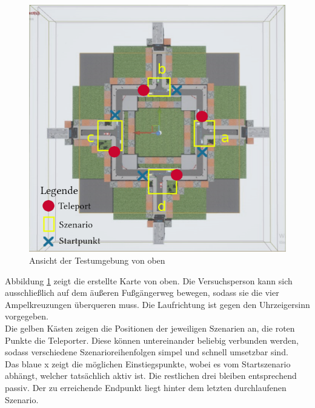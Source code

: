 \documentclass{Bericht}
\begin{document}
 
\begin{figure}[H]
	\centering
	\includegraphics[scale=0.7]{../Bilder/mapLegende.png}
	\caption{Ansicht der Testumgebung von oben}
	\label{img:map}
\end{figure}


Abbildung \ref{img:map} zeigt die erstellte Karte von oben. 
Die Versuchsperson kann sich ausschließlich auf dem äußeren Fußgängerweg bewegen, sodass sie die vier Ampelkreuzungen überqueren muss. Die Laufrichtung ist gegen den Uhrzeigersinn vorgegeben.\\
Die gelben Kästen zeigen die Positionen der jeweiligen Szenarien an, die roten Punkte die Teleporter. Diese können untereinander beliebig verbunden werden, sodass verschiedene Szenarioreihenfolgen simpel und schnell umsetzbar sind.\\
Das blaue x zeigt die möglichen Einstiegspunkte, wobei es vom Startszenario abhängt, welcher tatsächlich aktiv ist. Die restlichen drei bleiben entsprechend passiv. Der zu erreichende Endpunkt liegt hinter dem letzten durchlaufenen Szenario. 
\end{document}
